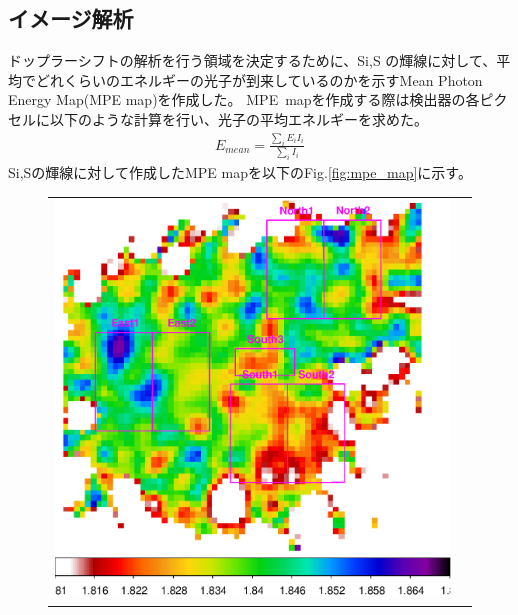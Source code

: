 \documentclass[a4j]{jarticle}%
\begin{document}
\subsection{イメージ解析}
ドップラーシフトの解析を行う領域を決定するために、\textrm{Si,S} の輝線に対して、平均でどれくらいのエネルギーの光子が到来しているのかを示す\textrm{Mean Photon Energy Map(MPE map)}を作成した。
MPE~mapを作成する際は検出器の各ピクセルに以下のような計算を行い、光子の平均エネルギーを求めた。\\
\begin{align}
  E_{mean} = \frac{\sum_{i} E_{i} I_{i}}{\sum_{i} I_{i}} \label{doppler-equation}
\end{align}
\textrm{Si,S}の輝線に対して作成したMPE mapを以下のFig.\ref{fig:mpe_map}に示す。

\begin{figure}[H]
  \begin{center}
  \begin{tabular}{cc}
  
  \begin{minipage}{0.5\hsize}
  \begin{center}
  \includegraphics[scale=0.50]{./Si_mean.eps}
  \end{center}
  \end{minipage}
  

\end{tabular}
\end{center}
\end{figure}
\end{document}
